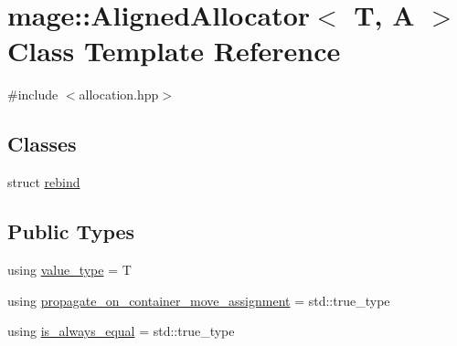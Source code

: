 \hypertarget{classmage_1_1_aligned_allocator}{}\section{mage\+:\+:Aligned\+Allocator$<$ T, A $>$ Class Template Reference}
\label{classmage_1_1_aligned_allocator}


{\ttfamily \#include $<$allocation.\+hpp$>$}

\subsection*{Classes}
\begin{DoxyCompactItemize}
\item 
struct \mbox{\hyperlink{structmage_1_1_aligned_allocator_1_1rebind}{rebind}}
\end{DoxyCompactItemize}
\subsection*{Public Types}
\begin{DoxyCompactItemize}
\item 
using \mbox{\hyperlink{classmage_1_1_aligned_allocator_a9e7c440f52f940161bd6cbf1b3c1d21c}{value\+\_\+type}} = T
\item 
using \mbox{\hyperlink{classmage_1_1_aligned_allocator_a810022ca5c53154ee0903a8f236b3395}{propagate\+\_\+on\+\_\+container\+\_\+move\+\_\+assignment}} = std\+::true\+\_\+type
\item 
using \mbox{\hyperlink{classmage_1_1_aligned_allocator_a144fbbf7d538636d83b3eb45965af6bf}{is\+\_\+always\+\_\+equal}} = std\+::true\+\_\+type
\end{DoxyCompactItemize}
